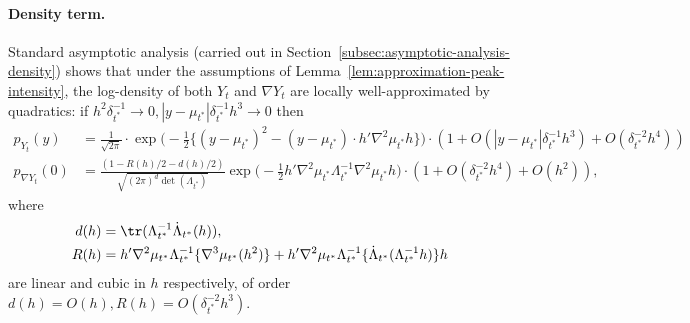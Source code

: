 \documentclass{article}
\begin{document}
	\paragraph{Density term.}
	Standard asymptotic analysis (carried out in Section~\ref{subsec:asymptotic-analysis-density}) shows that under the assumptions of Lemma~\ref{lem:approximation-peak-intensity}, the log-density of both $Y_t$ and $\nabla Y_t$ are locally well-approximated by quadratics: if $h^2 \delta_{t^*}^{-1} \to 0, |y - \mu_{t^*}| \delta_{t^*}^{-1}h^3 \to 0$ then
	\begin{align}
		p_{Y_t}(y) & = \frac{1}{\sqrt{2\pi}} \cdot \exp\Big(-\frac{1}{2}\Big\{(y - \mu_{t^*})^2 - (y - \mu_{t^*}) \cdot h'\nabla^2 \mu_{t^*} h\Big\} \Big) \cdot (1 + O(|y - \mu_{t^*}| \delta_{t^*}^{-1} h^3) + O(\delta_{t^*}^{-2}h^4)) \label{eqn:asymptotic-density-height}\\
		p_{\nabla Y_t}(0) & = \frac{(1 - R(h)/2 - d(h)/2)}{\sqrt{(2\pi)^d\det(\Lambda_{t^*})}}\exp\bigg(-\frac{1}{2}h' \nabla^2 \mu_{t^*} \Lambda_{t^*}^{-1}  \nabla^2 \mu_{t^*} h \bigg) \cdot (1 + O(\delta_{t^*}^{-2}h^4) + O(h^2)), \label{eqn:asymptotic-density-gradient}
	\end{align}
	where 
	\begin{align}
		d(h) & = \tr(\Lambda_{t^*}^{-1} \dot{\Lambda}_{t^*}(h)), \label{eqn:asymptotic-intensity-linear-term}\\
		R(h) & = h' \nabla^2 \mu_{t^*} \Lambda_{t^*}^{-1} \{\nabla^3\mu_{t^*}(h^2)\} +  h'\nabla^2 \mu_{t^*} \Lambda_{t^*}^{-1}\{\dot{\Lambda}_{t^*}(\Lambda_{t^*}^{-1}h)\} h \label{eqn:asymptotic-intensity-cubic-term}
	\end{align}
	are linear and cubic in $h$ respectively, of order $d(h) = O(h), R(h) = O(\delta_{t^*}^{-2}h^3)$. 
	
\end{document}
